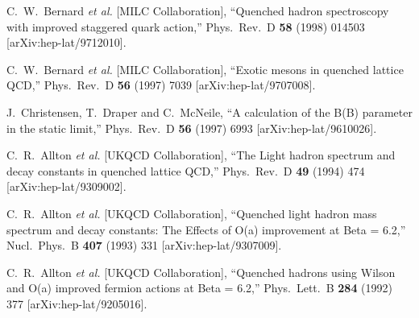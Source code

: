 \begin{thebibliography}{130}
C.~W.~Bernard {\it et al.}  [MILC Collaboration],
``Quenched hadron spectroscopy with improved staggered quark action,''
Phys.\ Rev.\ D {\bf 58} (1998) 014503
[arXiv:hep-lat/9712010].

C.~W.~Bernard {\it et al.}  [MILC Collaboration],
``Exotic mesons in quenched lattice QCD,''
Phys.\ Rev.\ D {\bf 56} (1997) 7039
[arXiv:hep-lat/9707008].

J.~Christensen, T.~Draper and C.~McNeile,
``A calculation of the B(B) parameter in the static limit,''
Phys.\ Rev.\ D {\bf 56} (1997) 6993
[arXiv:hep-lat/9610026].


C.~R.~Allton {\it et al.}  [UKQCD Collaboration],
``The Light hadron spectrum and decay constants in quenched lattice QCD,''
Phys.\ Rev.\ D {\bf 49} (1994) 474
[arXiv:hep-lat/9309002].

C.~R.~Allton {\it et al.}  [UKQCD Collaboration],
``Quenched light hadron mass spectrum and decay constants: The Effects of O(a) improvement at Beta = 6.2,''
Nucl.\ Phys.\ B {\bf 407} (1993) 331
[arXiv:hep-lat/9307009].


C.~R.~Allton {\it et al.}  [UKQCD Collaboration],
``Quenched hadrons using Wilson and O(a) improved fermion actions at Beta = 6.2,''
Phys.\ Lett.\ B {\bf 284} (1992) 377
[arXiv:hep-lat/9205016].




\end{thebibliography}

